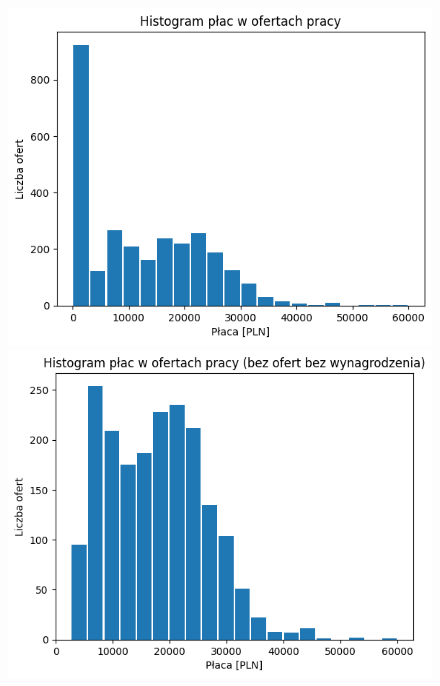 \documentclass{article}
\begin{document}
\begin{figure}[h]
    \centering
    \begin{minipage}{0.45\textwidth}
        \centering
        \includegraphics[width=\textwidth]{img/hist_zarobki_z_zerami.png}
    \end{minipage}
    \hfill
    \begin{minipage}{0.45\textwidth}
        \centering
        \includegraphics[width=\textwidth]{img/hist_zarobki_bez_zer.png}
    \end{minipage}
\end{figure}
\end{document}
